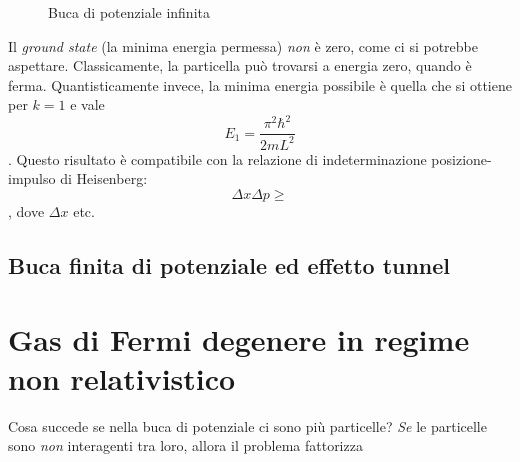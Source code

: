 \begin{figure}
   \centering
   \caption{Buca di potenziale infinita}
\end{figure}


Il \emph{ground state} (la minima energia permessa) \emph{non} \`e zero, come
ci si potrebbe aspettare. Classicamente, la particella pu\`o trovarsi a energia
zero, quando \`e ferma. Quantisticamente invece, la minima energia possibile
\`e quella che si ottiene per $k=1$ e vale
\begin{dmath*}
   E_{1} = \frac{\pi^{2} \hbar^{2}}{2mL^{2}} 
\end{dmath*}.
Questo risultato \`e compatibile con la relazione di indeterminazione posizione-impulso
di Heisenberg:
\begin{dmath*}
   \Delta x \Delta p \geq 
\end{dmath*},
dove $\Delta x $ etc. 


\subsection{Buca finita di potenziale ed effetto tunnel}



\section{Gas di Fermi degenere in regime non relativistico}

Cosa succede se nella buca di potenziale ci sono pi\`u particelle?
\emph{Se} le particelle sono \emph{non} interagenti tra loro, allora il
problema fattorizza 






